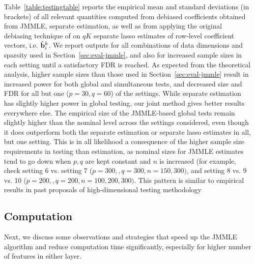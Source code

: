 Table~\ref{table:testingtable} reports the empirical mean and standard deviations (in brackets) of all relevant quantities computed from debiased coefficients obtained from JMMLE, separate estimation, as well as from applying the original debiasing technique of \citet{ZhangZhang14} on $qK$ separate lasso estimates of row-level coefficient vectors, i.e. $\hat {{\bf{b}}}_i^k$. We report outputs for all combinations of data dimensions and sparsity used in Section~\ref{sec:eval-jmmle}, and also for increased sample sizes in each setting until a satisfactory FDR is reached. As expected from the theoretical analysis, higher sample sizes than those used in Section~\ref{sec:eval-jmmle} result in increased power for both global and simultaneous tests, and decreased size and FDR for all but one ($p=30, q=60$) of the settings. While separate estimation has slightly higher power in global testing, our joint method gives better results everywhere else. The empirical size of the JMMLE-based global tests remain slightly higher than the nominal level across the settings considered, even though it does outperform both the separate estimation or separate lasso estimates in all, but one setting. This is in all likelihood a consequence of the higher sample size requirements in testing than estimation, as nominal sizes for JMMLE estimates tend to go down when $p,q$ are kept constant and $n$ is increased (for example, check setting 6 vs. setting 7 ($p = 300, ,q = 300, n = 150, 300)$, and setting 8 vs. 9 vs. 10 ($p = 200, ,q = 200, n = 100,200,300)$. This pattern is similar to empirical results in past proposals of high-dimensional testing methodology \citep{ref:JASA151658_WangPengLi,aispu}


\subsection{Computation}
\label{sec:tricks-jmmle}
Next, we discuss some observations and strategies that speed up the JMMLE algorithm and reduce computation time significantly, especially for higher number of features in either layer.

